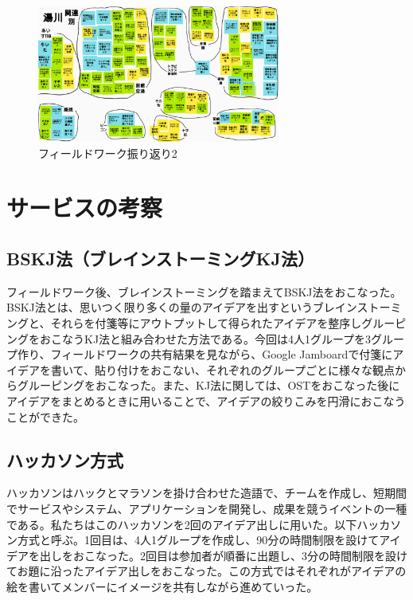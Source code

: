 \begin{figure}[htbp]
    \begin{center}
    \includegraphics[width=8cm]{images/FW2.png}
    \end{center}
    \caption{フィールドワーク振り返り2}
    \label{fig:furikaeri2}
\end{figure}


\section{サービスの考察}

\subsection{BSKJ法（ブレインストーミングKJ法）}
フィールドワーク後、ブレインストーミングを踏まえてBSKJ法をおこなった。BSKJ法とは、思いつく限り多くの量のアイデアを出すというブレインストーミングと、それらを付箋等にアウトプットして得られたアイデアを整序しグルーピングをおこなうKJ法と組み合わせた方法である。今回は4人1グループを3グループ作り、フィールドワークの共有結果を見ながら、Google Jamboardで付箋にアイデアを書いて、貼り付けをおこない、それぞれのグループごとに様々な観点からグルーピングをおこなった。また、KJ法に関しては、OSTをおこなった後にアイデアをまとめるときに用いることで、アイデアの絞りこみを円滑におこなうことができた。

\subsection{ハッカソン方式}
ハッカソンはハックとマラソンを掛け合わせた造語で、チームを作成し、短期間でサービスやシステム、アプリケーションを開発し、成果を競うイベントの一種である。私たちはこのハッカソンを2回のアイデア出しに用いた。以下ハッカソン方式と呼ぶ。1回目は、4人1グループを作成し、90分の時間制限を設けてアイデアを出しをおこなった。2回目は参加者が順番に出題し、3分の時間制限を設けてお題に沿ったアイデア出しをおこなった。この方式ではそれぞれがアイデアの絵を書いてメンバーにイメージを共有しながら進めていった。

